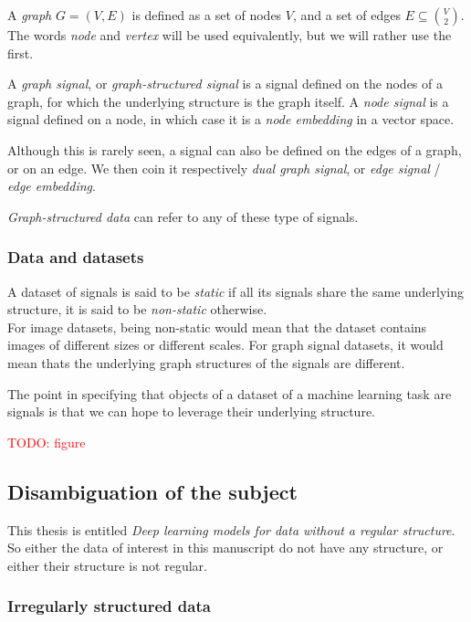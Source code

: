 A \emph{graph} $G = (V, E)$ is defined as a set of nodes $V$, and a set of edges $E \subseteq\binom{V}{2}$. The words \emph{node} and \emph{vertex} will be used equivalently, but we will rather use the first.

A \emph{graph signal}, or \emph{graph-structured signal} is a signal defined on the nodes of a graph, for which the underlying structure is the graph itself.
A \emph{node signal} is a signal defined on a node, in which case it is a \emph{node embedding} in a vector space.

Although this is rarely seen, a signal can also be defined on the edges of a graph, or on an edge. We then coin it respectively \emph{dual graph signal}, or \emph{edge signal} / \emph{edge embedding}.

\emph{Graph-structured data} can refer to any of these type of signals.

\subsubsection{Data and datasets}

A dataset of signals is said to be \emph{static} if all its signals share the same underlying structure, it is said to be \emph{non-static} otherwise.\\
For image datasets, being non-static would mean that the dataset contains images of different sizes or different scales. For graph signal datasets, it would mean thats the underlying graph structures of the signals are different.

The point in specifying that objects of a dataset of a machine learning task are signals is that we can hope to leverage their underlying structure.

\textcolor{red}{TODO: figure}

\subsection{Disambiguation of the subject}

This thesis is entitled \emph{Deep learning models for data without a regular structure}.
So either the data of interest in this manuscript do not have any structure, or either their structure is not regular.

\subsubsection{Irregularly structured data}


